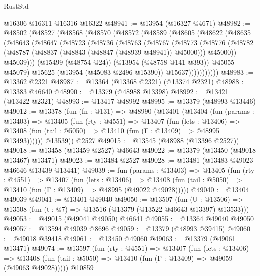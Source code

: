 \begin{lexlean}{RustStd}
\begin{coremodule}
    @16306
    @16311
    @16316
    @16322
@48941 := @13954 (@16327 @4671)
@48982 := @48502
    (@48527
      (@48568
        (@48570
          (@48572
            (@48589
              (@48605
                (@48622
                  (@48635
                    (@48643
                      (@48647
                        (@48723
                          (@48736
                            (@48763
                              (@48767
                                (@48773
                                  (@48776
                                    (@48782
                                      (@48787 (@48837 (@48843 (@48847 (@48939 @48941)) @45000)))
                                      @45000))
                                  @45039)))
                            (@15499 (@48754 @24))
                            (@13954 (@48758 @141 @393))
                            @45055
                            @45079)
                          @15625
                          (@13954 (@45083 @2496 @15390))
                          @15637)))))))))))
@48983 := @13362 @2321
@48987 := @13364 (@13368 @2321) (@13374 @2321)
@48988 := @13383 @46640
@48990 := @13379 (@48988 @13398)
@48992 := @13421 (@13422 @2321)
@48993 := @13417 @48992
@48995 := @13379 (@48993 @13446)
@49012 := @13378
    (fun (fn : @131) =>
    @48990
      (@13401
        (@13404
          (fun (params : @13403) =>
          @13405
            (fun (rty : @4551) =>
            @13407
              (fun (lets : @13406) =>
              @13408 (fun (tail : @5050) => @13410 (fun (Γ : @13409) => @48995 @13493))))))
        @13539))
    @2527
@49015 := @13545 (@48988 (@13396 @2527))
@49018 := @13458 (@13459 @2527) @46643
@49022 := @13379 (@13450 (@49018 @13467) @13471)
@49023 := @13484 @2527
@49028 := @13481 (@13483 @49023 @46646 @13439 @13441)
@49039 := fun (params : @13403) =>
  @13405
    (fun (rty : @4551) =>
    @13407
      (fun (lets : @13406) =>
      @13408 (fun (tail : @5050) => @13410 (fun (Γ : @13409) => @48995 (@49022 @49028)))))
@49040 := @13404 @49039
@49041 := @13401 @49040
@49050 := @13507
    (fun (U : @13506) => @13508 (fun (t : @7) => @13516 (@13379 (@13522 @46643 @13397) @13533)))
@49053 := @49015 (@49041 @49050) @46641
@49055 := @13364 @49040 @49050
@49057 := @13594 @49039 @8696
@49059 := @13379 (@48993 @39415)
@49060 := @49018 @39418
@49061 := @13450 @49060
@49063 := @13379 (@49061 @13471)
@49074 := @13597
    (fun (rty : @4551) =>
    @13407
      (fun (lets : @13406) =>
      @13408 (fun (tail : @5050) => @13410 (fun (Γ : @13409) => @49059 (@49063 @49028)))))
    @10859

\end{coremodule}
\end{lexlean}
